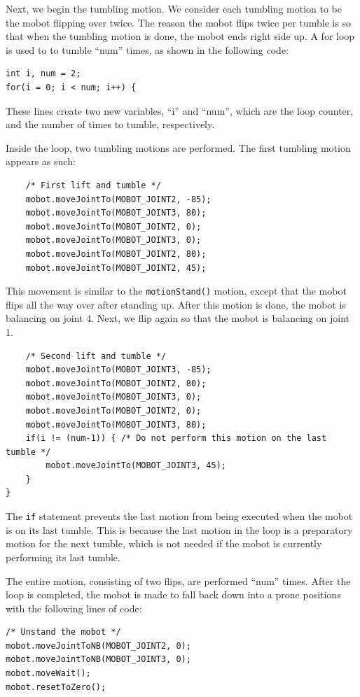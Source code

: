 \documentclass{article}
\begin{document}
Next, we begin the tumbling motion. We consider each tumbling motion to be the 
mobot flipping over twice. The reason the mobot flips twice per tumble is so that
when the tumbling motion is done, the mobot ends right side up. 
A for loop is used to to tumble ``num'' times, as shown in the following code:
\begin{verbatim}
int i, num = 2;
for(i = 0; i < num; i++) {
\end{verbatim}
These lines create two new variables, ``i'' and ``num'', which are the loop
counter, and the number of times to tumble, respectively. 

Inside the loop, two tumbling motions are performed. The first tumbling
motion appears as such:
\begin{verbatim}
    /* First lift and tumble */
    mobot.moveJointTo(MOBOT_JOINT2, -85);
    mobot.moveJointTo(MOBOT_JOINT3, 80);
    mobot.moveJointTo(MOBOT_JOINT2, 0);
    mobot.moveJointTo(MOBOT_JOINT3, 0);
    mobot.moveJointTo(MOBOT_JOINT2, 80);
    mobot.moveJointTo(MOBOT_JOINT2, 45);
\end{verbatim}
This movement is similar to the \texttt{motionStand()} motion, except that the
mobot flips all the way over after standing up. After this motion is done,
the mobot is balancing on joint 4. Next, we flip again so that the mobot
is balancing on joint 1.
\begin{verbatim}
    /* Second lift and tumble */
    mobot.moveJointTo(MOBOT_JOINT3, -85);
    mobot.moveJointTo(MOBOT_JOINT2, 80);
    mobot.moveJointTo(MOBOT_JOINT3, 0);
    mobot.moveJointTo(MOBOT_JOINT2, 0);
    mobot.moveJointTo(MOBOT_JOINT3, 80);
    if(i != (num-1)) { /* Do not perform this motion on the last tumble */
        mobot.moveJointTo(MOBOT_JOINT3, 45);
    }
}
\end{verbatim}
The \texttt{if} statement prevents the last motion from being executed
when the mobot is on its last tumble. This is because the last motion in the
loop is a preparatory motion for the next tumble, which is not needed if the
mobot is currently performing its last tumble. 

The entire motion, consisting of two flips, are performed ``num'' times. After
the loop is completed, the mobot is made to fall back down into a prone
positions with the following lines of code:
\begin{verbatim}
/* Unstand the mobot */
mobot.moveJointToNB(MOBOT_JOINT2, 0);
mobot.moveJointToNB(MOBOT_JOINT3, 0);
mobot.moveWait();
mobot.resetToZero();
\end{verbatim}
\end{document}
